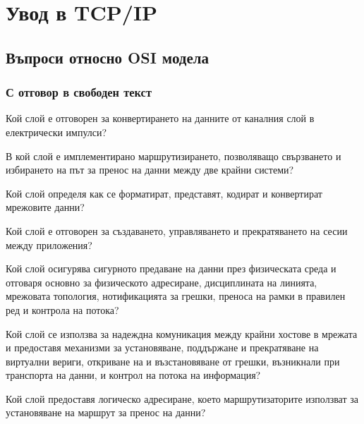 
\section{Увод в TCP/IP}
\subsection{Въпроси относно OSI модела}
\subsubsection{С отговор в свободен текст}
\begin{q}
  Кой слой е отговорен за конвертирането на данните от каналния слой в
  електрически импулси?
\end{q}

\begin{q}
  В кой слой е имплементирано маршрутизирането, позволяващо свързването и
  избирането на път за пренос на данни между две крайни системи?
\end{q}

\begin{q}
  Кой слой определя как се форматират, представят, кодират и конвертират
  мрежовите данни?
\end{q}

\begin{q}
  Кой слой е отговорен за създаването, управляването и прекратяването на сесии
  между приложения?
\end{q}

\begin{q}
  Кой слой осигурява сигурното предаване на данни през физическата среда и
  отговаря основно за физическото адресиране, дисциплината на линията, мрежовата
  топология, нотификацията за грешки, преноса на рамки в правилен ред и контрола
  на потока?
\end{q}

\begin{q}
  Кой слой се използва за надеждна комуникация между крайни хостове в мрежата и
  предоставя механизми за установяване, поддържане и прекратяване на виртуални
  вериги, откриване на и възстановяване от грешки, възникнали при транспорта на
  данни, и контрол на потока на информация?
\end{q}

\begin{q}
  Кой слой предоставя логическо адресиране, което маршрутизаторите използват за
  установяване на маршрут за пренос на данни?
\end{q}

